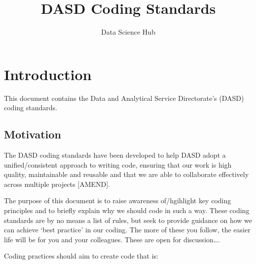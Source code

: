 \documentclass[]{book}
\title{DASD Coding Standards}
\author{Data Science Hub}
\date{}
\begin{document}
\maketitle

{
\setcounter{tocdepth}{1}
\tableofcontents
}
\hypertarget{intro}{%
\chapter*{Introduction}\label{intro}}

This document contains the Data and Analytical Service Directorate's (DASD) coding standards.

\hypertarget{motivation}{%
\section{Motivation}\label{motivation}}

The DASD coding standards have been developed to help DASD adopt a unified/consistent approach to writing code, ensuring that our work is high quality, maintainable and reusable and that we are able to collaborate effectively across multiple projects {[}AMEND{]}.

The purpose of this document is to raise awareness of/hgihlight key coding principles and to briefly explain why we should code in such a way. These coding standards are by no means a list of rules, but seek to provide guidance on how we can achieve `best practice' in our coding. The more of these you follow, the easier life will be for you and your colleagues. These are open for discussion\ldots.

Coding practices should aim to create code that is:
\end{document}

